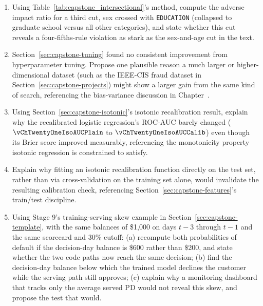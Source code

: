 \documentclass[../ai_in_finance]{subfiles}
\begin{document}
\begin{enumerate}[exercises]
    \item Using Table~\ref{tab:capstone_intersectional}'s method, compute the adverse impact ratio for a third cut, sex crossed with \texttt{EDUCATION} (collapsed to graduate school versus all other categories), and state whether this cut reveals a four-fifths-rule violation as stark as the sex-and-age cut in the text.
    \item Section~\ref{sec:capstone-tuning} found no consistent improvement from hyperparameter tuning. Propose one plausible reason a much larger or higher-dimensional dataset (such as the IEEE-CIS fraud dataset in Section~\ref{sec:capstone-projects}) might show a larger gain from the same kind of search, referencing the bias-variance discussion in Chapter~.
    \item Using Section~\ref{sec:capstone-isotonic}'s isotonic recalibration result, explain why the recalibrated logistic regression's ROC-AUC barely changed ($\vChTwentyOneIsoAUCPlain$ to $\vChTwentyOneIsoAUCCalib$) even though its Brier score improved measurably, referencing the monotonicity property isotonic regression is constrained to satisfy.
    \item Explain why fitting an isotonic recalibration function directly on the test set, rather than via cross-validation on the training set alone, would invalidate the resulting calibration check, referencing Section~\ref{sec:capstone-features}'s train/test discipline.
    \item Using Stage 9's training-serving skew example in Section~\ref{sec:capstone-template}, with the same balances of \$1{,}000 on days $t-3$ through $t-1$ and the same scorecard and $30\%$ cutoff: (a) recompute both probabilities of default if the decision-day balance is \$600 rather than \$200, and state whether the two code paths now reach the same decision; (b) find the decision-day balance below which the trained model declines the customer while the serving path still approves; (c) explain why a monitoring dashboard that tracks only the average served PD would not reveal this skew, and propose the test that would.
\end{enumerate}

\end{document}
